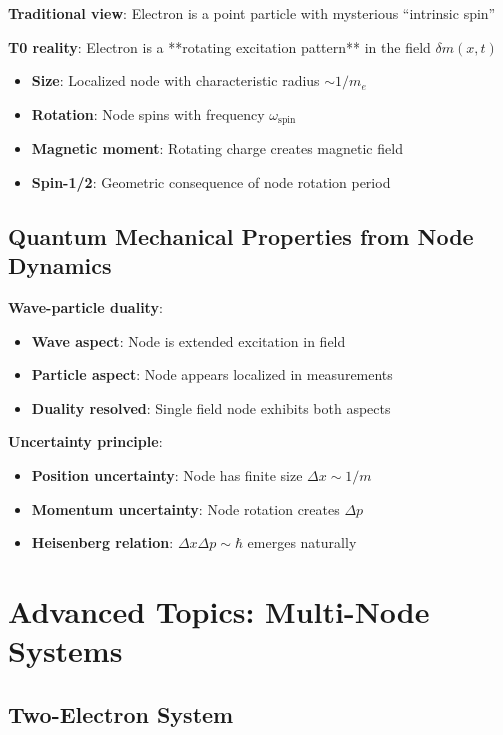 \documentclass[12pt,a4paper]{article}
\newcommand{\deltam}{\delta m}
\theoremstyle{definition}
\theoremstyle{remark}
\begin{document}
	\textbf{Traditional view}: Electron is a point particle with mysterious ``intrinsic spin''
	
	\textbf{T0 reality}: Electron is a **rotating excitation pattern** in the field $\deltam(x,t)$
	
	\begin{itemize}
		\item \textbf{Size}: Localized node with characteristic radius $\sim 1/m_e$
		\item \textbf{Rotation}: Node spins with frequency $\omega_{\text{spin}}$
		\item \textbf{Magnetic moment}: Rotating charge creates magnetic field
		\item \textbf{Spin-1/2}: Geometric consequence of node rotation period
	\end{itemize}
	
	\subsection{Quantum Mechanical Properties from Node Dynamics}
	
	\textbf{Wave-particle duality}: 
	\begin{itemize}
		\item \textbf{Wave aspect}: Node is extended excitation in field
		\item \textbf{Particle aspect}: Node appears localized in measurements
		\item \textbf{Duality resolved}: Single field node exhibits both aspects
	\end{itemize}
	
	\textbf{Uncertainty principle}:
	\begin{itemize}
		\item \textbf{Position uncertainty}: Node has finite size $\Delta x \sim 1/m$
		\item \textbf{Momentum uncertainty}: Node rotation creates $\Delta p$
		\item \textbf{Heisenberg relation}: $\Delta x \Delta p \sim \hbar$ emerges naturally
	\end{itemize}
	
	\section{Advanced Topics: Multi-Node Systems}
	
	\subsection{Two-Electron System}
	
\end{document}
